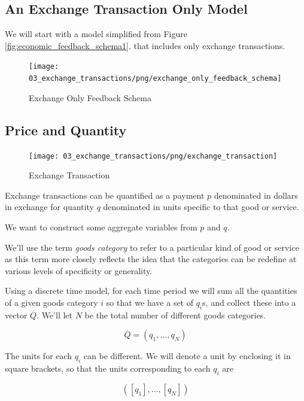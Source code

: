 \subsection{An Exchange Transaction Only Model}

We will start with a model simplified from Figure \ref{fig:economic_feedback_schema1}. that includes only
exchange transactions.

\begin{figure}[H]
\centering
\texttt{[image: 03\_exchange\_transactions/png/exchange\_only\_feedback\_schema]}
\caption{Exchange Only Feedback Schema}
\label{fig:exchange_only_feedback_schema1}
\end{figure}

\subsection{Price and Quantity}

\begin{figure}[H]
\centering
\texttt{[image: 03\_exchange\_transactions/png/exchange\_transaction]}
\caption{Exchange Transaction}
\label{fig:exchange_transaction2}
\end{figure}

Exchange transactions can be quantified as a payment $p$ denominated in dollars in exchange for
quantity $q$ denominated in units specific to that good or service.

We want to construct some aggregate variables from $p$ and $q$.

We'll use the term \textit{goods category} to refer to a particular kind of good or service as this
term more closely reflects the idea that the categories can be redefine at various levels of
specificity or generality.

Using a discrete time model, for each time period we will sum all the quantities of a given goods
category $i$ so that we have a set of $q_i$s, and collect these into a vector $\overline Q$. We'll
let $N$ be the total number of different goods categories.

\begin{equation}
    \overline Q = \left( q_1, \dots, q_N \right)
\end{equation}

The units for each $q_i$ can be different. We will denote a unit by enclosing it in square brackets,
so that the units corresponding to each $q_i$ are

\[ \left( \left[ q_1 \right], \dots, \left[ q_N \right] \right) \]

